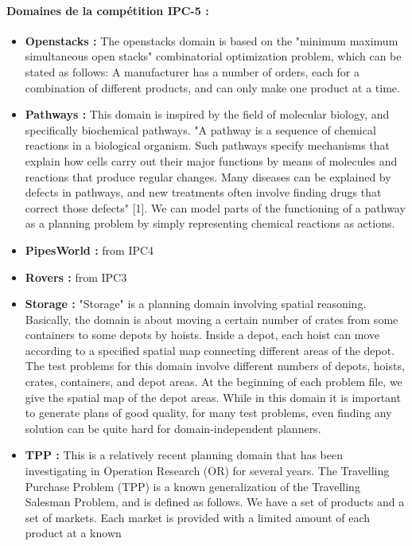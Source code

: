 \paragraph*{Domaines de la compétition IPC-5 :}
\begin{itemize}
\item \textbf{Openstacks :}
{\color{red}The openstacks domain is based on the "minimum maximum simultaneous open
stacks" combinatorial optimization problem, which can be stated as follows: 
A manufacturer has a number of orders, each for a combination of different 
products, and can only make one product at a time.}
\item \textbf{Pathways :}
{\color{red}This domain is inspired by the field of molecular biology, and specifically 
biochemical pathways. "A pathway is a sequence of chemical reactions in a
biological organism. Such pathways specify mechanisms that explain how
cells carry out their major functions by means of molecules and reactions
that produce regular changes. Many diseases can be explained by defects 
in pathways, and new treatments often involve finding drugs that correct
those defects" [1]. We can model parts of the functioning of a pathway as
a planning problem by simply representing chemical reactions as actions.}
\item \textbf{PipesWorld :}
{\color{red}from IPC4}
\item \textbf{Rovers :}
{\color{red}from IPC3}
\item \textbf{Storage :}
{\color{red}"Storage" is a planning domain involving spatial reasoning. Basically, the
domain is about moving a certain number of crates from some containers to
some depots by hoists. Inside a depot, each hoist can move according to a
specified spatial map connecting different areas of the depot. The test
problems for this domain involve different numbers of depots, hoists,
crates, containers, and depot areas. At the beginning of each problem
file, we give the spatial map of the depot areas. While in this domain it
is important to generate plans of good quality, for many test problems,
even finding any solution can be quite hard for domain-independent
planners.}
\item \textbf{TPP :}
{\color{red}This is a relatively recent planning domain that has been investigating in
Operation Research (OR) for several years. The Travelling Purchase Problem
(TPP) is a known generalization of the Travelling Salesman Problem, and is
defined as follows. We have a set of products and a set of markets. Each
market is provided with a limited amount of each product at a known
}
\end{itemize}
